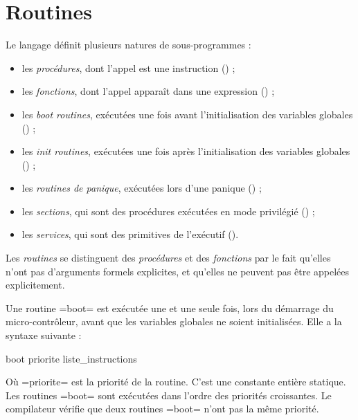 




\chapter{Routines}

Le langage définit plusieurs natures de sous-programmes :
\begin{itemize}
  \item les \emph{procédures}, dont l'appel est une instruction () ;
  \item les \emph{fonctions}, dont l'appel apparaît dans une expression () ;
  \item les \emph{boot routines}, exécutées une fois avant l'initialisation des variables globales () ;
  \item les \emph{init routines}, exécutées une fois après l'initialisation des variables globales () ;
  \item les \emph{routines de panique}, exécutées lors d'une panique () ;
  \item les \emph{sections}, qui sont des procédures exécutées en mode privilégié () ;
  \item les \emph{services}, qui sont des primitives de l'exécutif ().
\end{itemize}

Les \emph{routines} se distinguent des \emph{procédures} et des \emph{fonctions} par le fait qu'elles n'ont pas d'arguments formels explicites, et qu'elles ne peuvent pas être appelées explicitement.










Une routine \plm=boot= est exécutée une et une seule fois, lors du démarrage du micro-contrôleur, avant que les variables globales ne soient initialisées. Elle a la syntaxe suivante :
\begin{PLM}
boot priorite {
  liste_instructions
}
\end{PLM}
Où \plm=priorite= est la priorité de la routine. C'est une constante entière statique. Les routines \plm=boot= sont exécutées dans l'ordre des priorités croissantes. Le compilateur vérifie que deux routines \plm=boot= n'ont pas la même priorité.

